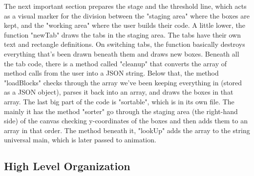 \documentclass[a4paper]{article}
\begin{document}
The next important section prepares the stage and the threshold line, which acts as a visual marker for the division between the "staging area" where the boxes are kept, and the "working area" where the user builds their code. A little lower, the function "newTab" draws the tabs in the staging area. The tabs have their own text and rectangle definitions. On switching tabs, the function basically destroys everything that's been drawn beneath them and draws new boxes. 
Beneath all the tab code, there is a method called "cleanup" that converts the array of method calls from the user into a JSON string. Below that, the method "loadBlocks" checks through the array we've been keeping everything in (stored as a JSON object), parses it back into an array, and draws the boxes in that array. The last big part of the code is "sortable", which is in its own file. The mainly it has the method "sorter" go through the staging area (the right-hand side) of the canvas checking y-coordinates of the boxes and then adds them to an array in that order. The method beneath it, "lookUp" adds the array to the string universal main, which is later passed to animation.

\subsection{High Level Organization}
\end{document}

